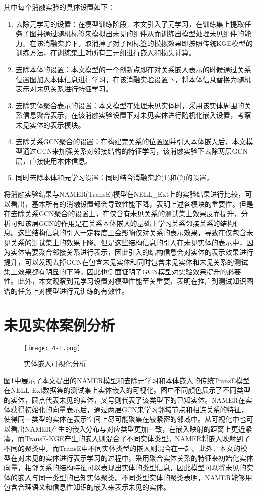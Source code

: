 其中每个消融实验的具体设置如下：
\begin{enumerate}[label=\arabic*)]
  \item 去除元学习的设置：在模型训练阶段，本文引入了元学习，在训练集上提取任务子图并通过随机标签来模拟出未见的组件从而训练出模型处理未见组件的能力。在该消融实验下，取消掉了对子图标签的模拟效果即按照传统KGE模型的训练方法，在训练集上对所有三元组进行嵌入和损失计算。
  \item 去除本体的设置：本文模型的一个创新点即在对关系嵌入表示的时候通过关系位置图加入本体信息进行学习，在该消融实验设置下，将本体信息替换为随机表示对未见关系进行特征学习。
  \item 去除实体聚合表示的设置：本文模型在处理未见实体时，采用该实体周围的关系信息聚合表示，在该消融实验设置下对未见实体进行随机化嵌入设置，考察未见实体的表示模块。
  \item 去除关系GCN聚合的设置：在构建完关系的位置图并引入本体嵌入后，本文模型通过GCN来加强关系对邻接结构的特征学习，该消融实验下去除两层GCN层，直接使用本体信息。
  \item 同时去除本体和元学习设置：同时结合消融实验(1)和(2)的设置。
\end{enumerate}

将消融实验结果与NAMER(TransE)模型在NELL\_Ext上的实验结果进行比较，可以看出，基本所有的消融设置都会导致性能下降，表明上述各模块的重要性。但是在去除关系GCN聚合的设置上，在仅含有未见关系的测试集上效果反而提升，分析可知该层GCN的作用是在关系本体嵌入的基础上学习关系邻接关系的结构信息。这些结构信息的引入一定程度上会影响仅对关系的表示效果，导致在仅包含未见关系的测试集上的效果下降。但是这些结构信息的引入在未见实体的表示中，因为实体需要聚合邻接关系进行表示，因此引入的结构信息会对实体的表示效果进行提升，可以发现去掉GCN在包含未见实体和同时包含未见实体和未见关系的测试集上效果都有明显的下降，因此也侧面证明了GCN模型对实验效果提升的必要性。此外，本文观察到元学习设置对模型性能至关重要，表明在推广到测试知识图谱的任务上对模型进行元训练的有效性。

\section{未见实体案例分析}
\begin{figure}[h]
  \centering
  \texttt{[image: 4-1.png]}
  \caption{实体嵌入可视化分析}
  \label{fig:4-1}
\end{figure}
图\ref{fig:4-1}中展示了本文提出的NAMER模型和去除元学习和本体嵌入的传统TransE模型在NELL-Ext数据集的测试集上实体嵌入的可视化。图中不同颜色展示了不同类型的实体，圆点代表未见的实体，叉号则代表了该类型下的已知实体。NAMER在实体获得初始化的向量表示后，通过两层GCN来学习邻域节点和相连关系的特征，使得同一类型的实体在表示空间上尽可能聚集在较紧密的邻域中。从可视化中也可以看出NAMER产生的嵌入分布与对应类型更加一致，在嵌入映射的距离上更近紧凑，而TransE-KGE产生的嵌入则混合了不同实体类型。NAMER将嵌入映射到了不同的聚类中，而TransE中不同实体类型的嵌入则混合在一起。此外，本文的模型在对未见的实体进行表示学习的过程中，采用聚合实体关系的特征来初始化实体向量，相邻关系的结构特征可以表现出实体的类型信息，因此模型可以将未见的实体的嵌入与同一类型的已知实体聚类。不同类型实体的聚类表明，NAMER能够用包含合理语义和信息性知识的嵌入来表示未见的实体。

